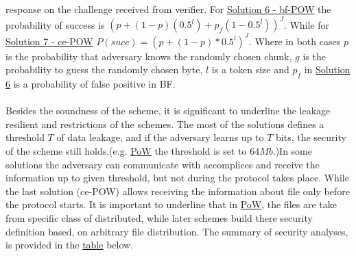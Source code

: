 \documentclass[12pt]{article}
\begin{document}
response on the challenge received from verifier.  For  \hyperref[sub:Soltuion6]{Solution 6 - bf-POW} the probability of success is $(p+(1-p)(0.5^l)+p_f(1-0.5^l))^J$. While for \hyperref[sub:Soltuion7]{Solution 7 - ce-POW} $P(succ) = (p+(1-p)*0.5^l)^J$. Where in both cases $p$ is the probability that adversary knows the randomly chosen chunk, $g$ is the probability to guess the randomly chosen byte, $l$ is a token size and $p_f$ in \hyperref[sub:Soltuion6]{Solution 6} is a probability of false positive in BF.\\\\
Besides the soundness of the scheme, it is significant to underline the leakage resilient  and restrictions of the schemes. The most of the solutions defines a threshold $T$ of data leakage, and if the adversary learns up to $T$ bits, the security of the scheme still holds.(e.g.  \hyperref[sub:Soltuion1]{PoW} the threshold is set to $64Mb$.)In some solutions the adversary can communicate with accomplices and receive the information up to given threshold, but not during the protocol takes place. While the last solution (ce-POW)  allows receiving the information about file only before the protocol starts. It is important to underline that in \hyperref[sub:Soltuion1]{PoW}, the files are take from specific class of distributed, while later schemes build there security definition based, on arbitrary file distribution.  The summary of security analyses, is provided in the \hyperref[table:Security]{table} below.
\end{document}
